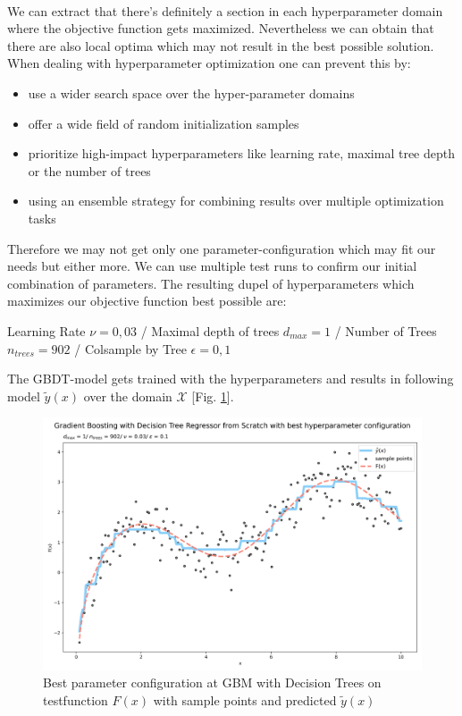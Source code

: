 \documentclass[12pt, a4paper]{article}
\begin{document}
\\
We can extract that there's definitely a section in each hyperparameter domain where the objective function gets maximized. Nevertheless we can obtain that there are also local optima which may not result in the best possible solution. When dealing with hyperparameter optimization one can prevent this by:
\begin{itemize}
    \item use a wider search space over the hyper-parameter domains
    \item offer a wide field of random initialization samples
    \item prioritize high-impact hyperparameters like learning rate, maximal tree depth or the number of trees
    \item using an ensemble strategy for combining results over multiple optimization tasks
\end{itemize}
Therefore we may not get only one parameter-configuration which may fit our needs but either more. We can use multiple test runs to confirm our initial combination of parameters. The resulting dupel of hyperparameters which maximizes our objective function best possible are: \\
\begin{center}
    Learning Rate $\nu = 0,03$ / Maximal depth of trees $d_{max} = 1$ / Number of Trees $n_{trees} = 902$ / Colsample by Tree $\epsilon = 0,1$
\end{center}
The GBDT-model gets trained with the hyperparameters and results in following model $\tilde{y}(x)$ over the domain $\mathcal{X}$ [Fig. \ref{fig: gbm_dt_best_par}].
\begin{figure}[!htpb]
    \centering
    \includegraphics[width=1\textwidth,trim={0 0 0 0},clip]{figures/gbm_with_decision_tree_best_parameters.png}
    \caption[Best parameter configuration at GBM with Decision Trees on testfunction]{Best parameter configuration at GBM with Decision Trees on testfunction $F(x)$ with sample points and predicted $\tilde{y}(x)$}
    \label{fig: gbm_dt_best_par}    
\end{figure}
\newpage
\end{document}
